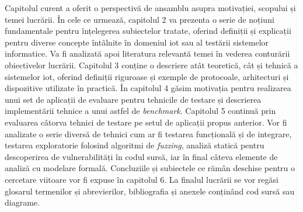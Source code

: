 Capitolul curent a oferit o perspectivă de ansamblu asupra motivației, scopului și temei lucrării. În cele ce urmează, capitolul 2 va prezenta o serie de noțiuni fundamentale pentru înțelegerea subiectelor tratate, oferind definiții și explicații pentru diverse concepte întâlnite în domeniul \acrshort{iot} sau al testării sistemelor informatice. Va fi analizată apoi literatura relevantă temei în vederea conturării obiectivelor lucrării. Capitolul 3 conține o descriere atât teoretică, cât și tehnică a sistemelor \acrshort{iot}, oferind definiții riguroase și exemple de protocoale, arhitecturi și dispozitive utilizate în practică. În capitolul 4 găsim motivația pentru realizarea unui set de aplicații de evaluare pentru tehnicile de testare și descrierea implementării tehnice a unui astfel de \textit{benchmark}. Capitolul 5 continuă prin evaluarea câtorva tehnici de testare pe setul de aplicații propus anterior. Vor fi analizate o serie diversă de tehnici cum ar fi testarea funcțională și de integrare, testarea exploratorie folosind algoritmi de \textit{fuzzing}, analiză statică pentru descoperirea de vulnerabilități în codul sursă, iar în final câteva elemente de analiză cu modelare formală. Concluziile și subiectele ce rămân deschise pentru o cercetare viitoare vor fi expuse în capitolul 6. La finalul lucrării se vor regăsi glosarul termenilor și abrevierilor, bibliografia și anexele conținând cod sursă sau diagrame.